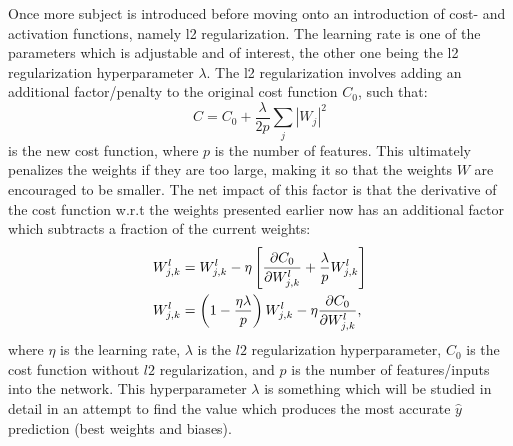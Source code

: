             Once more subject is introduced before moving onto an introduction of cost- and activation functions, namely l2 regularization. The learning rate is one of the parameters which is adjustable and of interest, the other one being the l2 regularization hyperparameter $\lambda$. The l2 regularization involves adding an additional factor/penalty to the original cost function $C_0$, such that:
            \begin{equation}
                C = C_0 + \frac{\lambda}{2p} \sum_j |W_j|^2
            \end{equation}{}
            is the new cost function, where $p$ is the number of features. This ultimately penalizes the weights if they are too large, making it so that the weights $W$ are encouraged to be smaller. The net impact of this factor is that the derivative of the cost function w.r.t the weights presented earlier now has an additional factor which subtracts a fraction of the current weights:
            \begin{align}
                W^l_{j,k} &= W^l_{j,k} - \eta\left[ \pdv{C_0}{W^l_{j,k}} + \frac{\lambda}{p} W^l_{j,k} \right]\\
                W^l_{j,k} &= \left(1-\frac{\eta\lambda}{p}\right)W^l_{j,k} - \eta \pdv{C_0}{W^l_{j,k}},
            \end{align}
            where $\eta$ is the learning rate, $\lambda$ is the $l2$ regularization hyperparameter, $C_0$ is the cost function without $l2$ regularization, and $p$ is the number of features/inputs into the network. This hyperparameter $\lambda$ is something which will be studied in detail in an attempt to find the value which produces the most accurate $\hat{y}$ prediction (best weights and biases).
            
